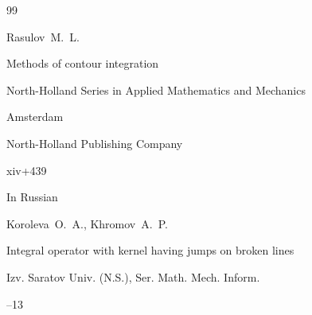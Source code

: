\begin{thebibliography}{99}









\by Rasulov~M.~L.

\book Methods of contour integration


\serial North-Holland Series in Applied Mathematics and Mechanics


\publaddr Amsterdam

\publ North-Holland Publishing Company

\totalpages xiv+439 





\lang In Russian

\by Koroleva~O.~A., Khromov~A.~P.

\paper Integral operator with kernel having jumps on broken lines

\jour Izv. Saratov Univ. (N.S.), Ser. Math. Mech. Inform.




--13





\end{thebibliography}





%









